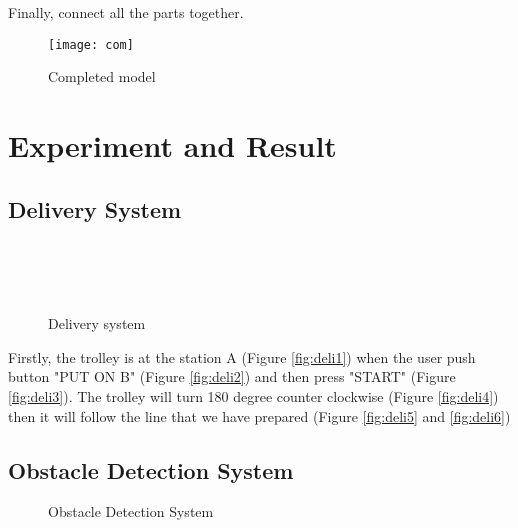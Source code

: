 \documentclass[12pt]{article}
\begin{document}
Finally, connect all the parts together.

\begin{figure}[H]
	\centering
	\texttt{[image: com]}
	\caption{Completed model} \label{fig:com}
\end{figure}


\section{Experiment and Result} \label{sec:experiment}

\subsection{Delivery System} \label{subsec:delivery}
\begin{figure}[H]
	\centering
	 \hspace{1cm}
	 \\ \vspace{0.5cm}
	\hspace{1cm}
	 \\ \vspace{0.5cm}
	\hspace{1cm}
	 \\
	\caption{Delivery system} \label{fig:deli}
\end{figure}

Firstly, the trolley is at the station A (Figure \ref{fig:deli1}) when the user push button "PUT ON B" (Figure \ref{fig:deli2}) and then press "START" (Figure \ref{fig:deli3}). The trolley will turn 180 degree counter clockwise (Figure \ref{fig:deli4}) then it will follow the line that we have prepared (Figure \ref{fig:deli5} and \ref{fig:deli6})

\subsection{Obstacle Detection System} \label{subsec:obstacle}

\begin{figure}[H]
	\centering
	\subfloat[
	\label{fig:ob1}]{\texttt{[image: ob1]}} \hspace{1cm}
	\subfloat[
	\label{fig:ob2}]{\texttt{[image: ob2]}}
	\hspace{1cm}
	\subfloat[
	\label{fig:ob3}]{\texttt{[image: ob3]}}
	\caption{Obstacle Detection System} \label{fig:ob}
\end{figure}
\end{document}
